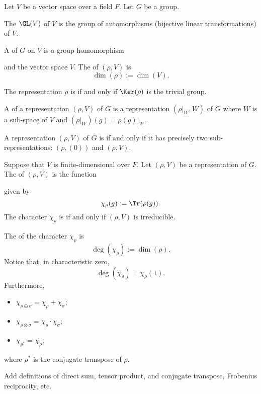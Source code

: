 \documentclass [preview, border = 20pt] {standalone}
\begin{document}
\pagecolor{black}
\color{white}

\setlength{\parskip}{1 em}

Let $V$ be a vector space over a field $F$. Let $G$ be a group.

The  $\GL(V)$ of $V$ is the group of automorphisms (bijective linear transformations) of $V$.

A  of $G$ on $V$ is a group homomorphism
\begin{center}
\end{center}
and the vector space $V$. The  of $(\rho, V)$ is
\[
\dim(\rho) := \dim(V).
\]

The representation $\rho$ is  if and only if $\Ker(\rho)$ is the trivial group. 

A  of a representation $(\rho, V)$ of $G$ is a representation $(\rho\big|_W, W)$ of $G$ where $W$ is a sub-space of $V$ and $(\rho\big|_W)(g) = \rho(g)\big |_W$.

A representation $(\rho, V)$ of $G$ is  if and only if it has precisely two sub-representations: $(\rho,(0))$ and $(\rho,V)$.

Suppose that $V$ is finite-dimensional over $F$. Let $(\rho, V)$ be a representation of $G$. The  of $(\rho, V)$ is the function
\begin{center}
\end{center}
given by
\[
\chi_\rho(g) := \Tr(\rho(g)).
\]
The character $\chi_\rho$ is  if and only if $(\rho, V)$ is irreducible. 

The  of the character $\chi_\rho$ is
\[
\deg(\chi_\rho) := \dim(\rho).
\]
Notice that, in characteristic zero,
\[
\deg(\chi_\rho) = \chi_\rho(1).
\]
Furthermore,
\begin{itemize}[topsep = 0 em, itemsep = 0 em]
\item $\chi_{\rho\oplus\sigma} = \chi_{\rho} + \chi_{\sigma}$;
\item $\chi_{\rho\otimes\sigma} = \chi_{\rho} \cdot \chi_{\sigma}$;
\item $\chi_{\rho^*} = \overline{\chi_{\rho}}$;
\end{itemize}
where $\rho^*$ is the conjugate transpose of $\rho$.

Add definitions of direct sum, tensor product, and conjugate transpose, Frobenius reciprocity, etc.
\end{document}
